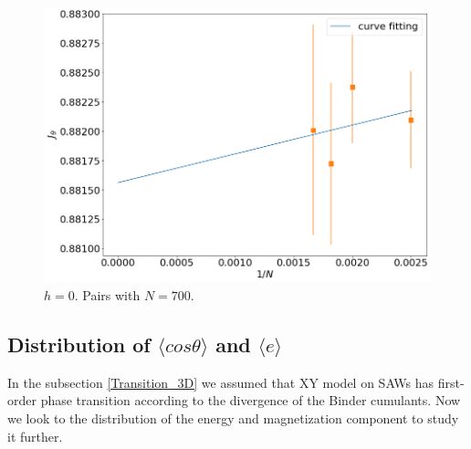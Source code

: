  \begin{figure}
	\centering 
	\includegraphics[scale=0.2]{Images/criticalr2_3D.png}
	\caption{$h=0$. Pairs with $N=700$.  }
	\label{fig:JthetaLinear_3D}
\end{figure}


\subsection{Distribution of $\langle cos \theta \rangle$ and $\langle e \rangle$ } \label{sec:distributions_3D}

In the subsection \ref{Transition_3D} we assumed that XY model on SAWs has first-order phase transition according to the divergence of the Binder cumulants. Now we look to the distribution of the energy and magnetization component to study it further. 
 